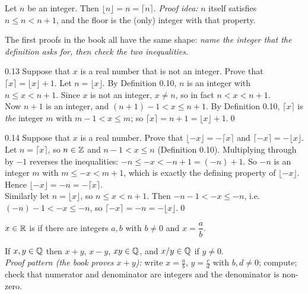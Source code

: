\begin{result}[{Proposition 0.12}]
Let $n$ be an integer. Then $\lfloor n\rfloor=n=\lceil n\rceil$. \quad\emph{Proof idea:} $n$ itself satisfies $n\le n<n+1$, and the floor is the (only) integer with that property.
\end{result}

The first proofs in the book all have the same shape: \emph{name the integer that the definition asks for, then check the two inequalities.}

\begin{bookex}{0.13}
Suppose that $x$ is a real number that is not an integer. Prove that $\lceil x\rceil=\lfloor x\rfloor+1$.
\solution
Let $n=\lfloor x\rfloor$. By Definition 0.10, $n$ is an integer with $n\le x<n+1$. Since $x$ is not an integer, $x\ne n$, so in fact $n<x<n+1$.\\
Now $n+1$ is an integer, and $(n+1)-1<x\le n+1$. By Definition 0.10, $\lceil x\rceil$ is \emph{the} integer $m$ with $m-1<x\le m$; so $\lceil x\rceil=n+1=\lfloor x\rfloor+1$.\qed
\end{bookex}

\begin{bookex}[recommended]{0.14}
Suppose that $x$ is a real number. Prove that $\lfloor-x\rfloor=-\lceil x\rceil$ and $\lceil-x\rceil=-\lfloor x\rfloor$.
\solution
Let $n=\lceil x\rceil$, so $n\in\mathbb{Z}$ and $n-1<x\le n$ (Definition 0.10). Multiplying through by $-1$ reverses the inequalities: $-n\le-x<-n+1=(-n)+1$. So $-n$ is an integer $m$ with $m\le-x<m+1$, which is exactly the defining property of $\lfloor-x\rfloor$. Hence $\lfloor-x\rfloor=-n=-\lceil x\rceil$.\\
Similarly let $n=\lfloor x\rfloor$, so $n\le x<n+1$. Then $-n-1<-x\le-n$, i.e.\ $(-n)-1<-x\le-n$, so $\lceil-x\rceil=-n=-\lfloor x\rfloor$.\qed
\end{bookex}

\begin{key}
$x\in\mathbb{R}$ is  if there are integers $a,b$ with $b\ne0$ and $x=\dfrac ab$.
\end{key}

\begin{result}
If $x,y\in\mathbb{Q}$ then $x+y$, $x-y$, $xy\in\mathbb{Q}$, and $x/y\in\mathbb{Q}$ if $y\ne0$.\\
\emph{Proof pattern (the book proves $x+y$):} write $x=\frac ab$, $y=\frac cd$ with $b,d\ne0$; compute; check that numerator and denominator are integers and the denominator is non-zero.
\end{result}

